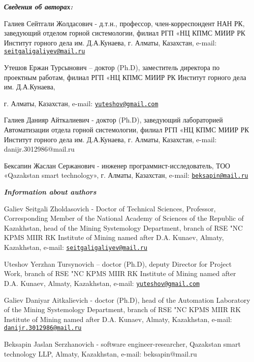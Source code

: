 \emph{{\bfseries Сведения об авторах:}}

Галиев Сейтгали Жолдасович - д.т.н., профессор, член-корреспондент НАН
РК, заведующий отделом горной системологии, филиал РГП «НЦ КПМС МИИР РК
Институт горного дела им. Д.А.Кунаева, г. Алматы, Казахстан, e-mail:
\href{mailto:seitgaligaliyev@mail.ru}{\nolinkurl{seitgaligaliyev@mail.ru}}

Утешов Ержан Турсынович -- доктор (Ph.D), заместитель директора по
проектным работам, филиал РГП «НЦ КПМС МИИР РК Институт горного дела им.
Д.А.Кунаева,

г. Алматы, Казахстан, e-mail:
\href{mailto:yuteshov@gmail.com}{\nolinkurl{yuteshov@gmail.com}}

Галиев Данияр Айткалиевич - доктор (Ph.D), заведующий лабораторией
Автоматизации отдела горной системологии, филиал РГП «НЦ КПМС МИИР РК
Институт горного дела им. Д.А.Кунаева, г. Алматы, Казахстан, e-mail:
danijr.3012986@mail.ru

Бексапин Жаслан Сержанович - инженер программист-исследователь, ТОО
«Qazakstan smart technology», г. Алматы, Казахстан, e-mail:
\href{mailto:beksapin@mail.ru}{\nolinkurl{beksapin@mail.ru}}

\emph{{\bfseries Information about authors}}

Galiev Seitgali Zholdasovich - Doctor of Technical Sciences, Professor,
Corresponding Member of the National Academy of Sciences of the Republic
of Kazakhstan, head of the Mining Systemology Department, branch of RSE
"NC KPMS MIIR RK Institute of Mining named after D.A. Kunaev, Almaty,
Kazakhstan, e-mail:
\href{mailto:seitgaligaliyev@mail.ru}{\nolinkurl{seitgaligaliyev@mail.ru}}

Uteshov Yerzhan Tursynovich -- doctor (Ph.D), deputy Director for
Project Work, branch of RSE "NC KPMS MIIR RK Institute of Mining named
after D.A. Kunaev, Almaty, Kazakhstan, e-mail:
\href{mailto:yuteshov@gmail.com}{\nolinkurl{yuteshov@gmail.com}}

Galiev Daniyar Aitkalievich - doctor (Ph.D), head of the Automation
Laboratory of the Mining Systemology Department, branch of RSE "NC KPMS
MIIR RK Institute of Mining named after D.A. Kunaev, Almaty, Kazakhstan,
e-mail:
\href{mailto:danijr.3012986@mail.ru}{\nolinkurl{danijr.3012986@mail.ru}}

Beksapin Jaslan Serzhanovich - software engineer-researcher, Qazakstan
smart technology LLP, Almaty, Kazakhstan, e-mail: beksapin@mail.ru
